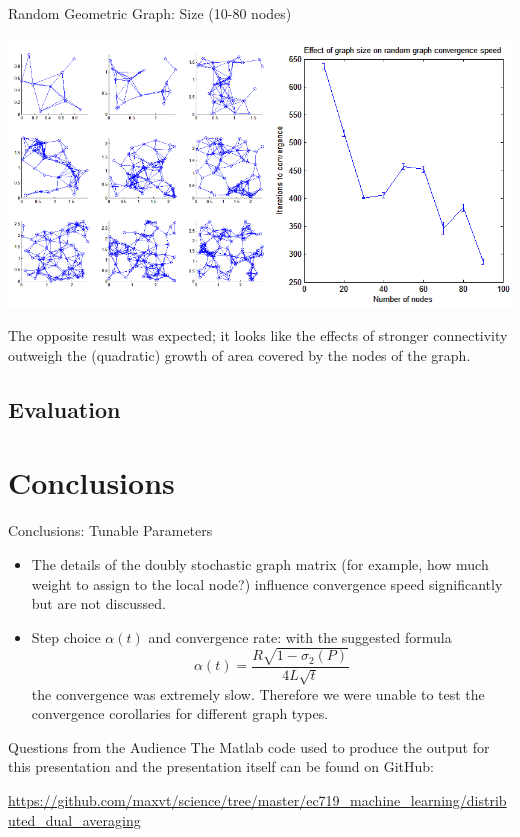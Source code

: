 \documentclass{beamer}
\begin{document}
	\begin{frame}{Random Geometric Graph: Size (10-80 nodes)}
		\centerline{\includegraphics[width=\textwidth]{size_vs_conv.png}}
		The opposite result was expected; it looks like the effects of stronger connectivity
		outweigh the (quadratic) growth of area covered by the nodes of the graph.
	\end{frame}	
	
			
	\subsection{Evaluation}
	
	\section{Conclusions}
	\begin{frame}{Conclusions: Tunable Parameters}
		\begin{itemize}
			\item	The details of the doubly stochastic graph matrix (for example, how much weight to 
			assign to the local node?) influence convergence speed significantly but are not discussed.
			\item Step choice $\alpha(t)$ and convergence rate: with the suggested formula
			\[\alpha(t) = \frac{R\sqrt{1-\sigma_2(P)}}{4L\sqrt{t}}\]
			the convergence was extremely slow. Therefore we were unable to test the convergence
			corollaries for different graph types.
		\end{itemize}			
	\end{frame}
	
	\begin{frame}{Questions from the Audience}
		The Matlab code used to produce the output for this presentation and the presentation itself
		can be found on GitHub:
		
		\begin{block}{}
		\url{https://github.com/maxvt/science/tree/master/ec719_machine_learning/distributed_dual_averaging}
		\end{block}
	\end{frame}
\end{document}
